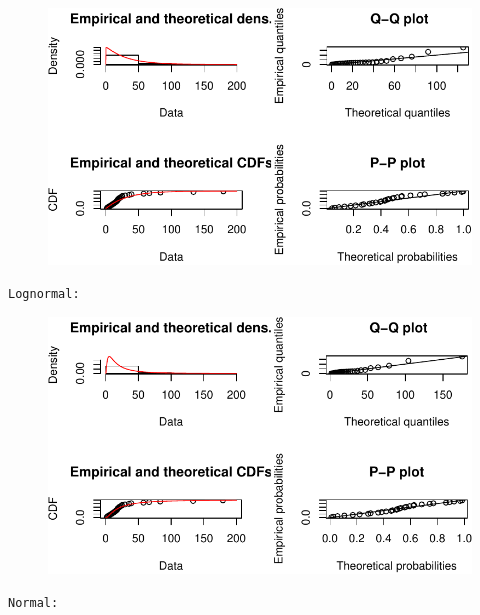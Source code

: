 \documentclass[
  letterpaper,
  DIV=11,
  numbers=noendperiod]{scrartcl}
\begin{document}
\begin{figure}[H]

{\centering \includegraphics{quiz5_files/figure-pdf/unnamed-chunk-35-3.pdf}

}

\end{figure}

\begin{verbatim}
Lognormal: 
\end{verbatim}

\begin{figure}[H]

{\centering \includegraphics{quiz5_files/figure-pdf/unnamed-chunk-35-4.pdf}

}

\end{figure}

\begin{verbatim}
Normal: 
\end{verbatim}
\end{document}
